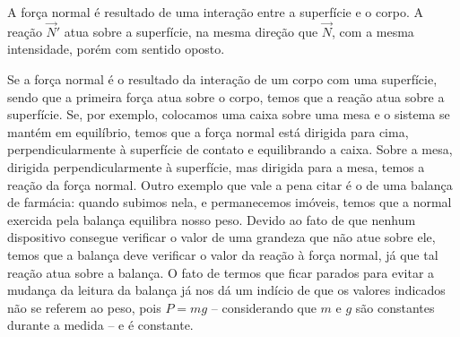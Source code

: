 \begin{marginfigure}[-4cm]
\centering
{}
\caption{A força normal é resultado de uma interação entre a superfície e o corpo. A reação $\vec{N}'$ atua sobre a superfície, na mesma direção que $\vec{N}$, com a mesma intensidade, porém com sentido oposto.}
\end{marginfigure}

Se a força normal é o resultado da interação de um corpo com uma superfície, sendo que a primeira força atua sobre o corpo, temos que a reação atua sobre a superfície. Se, por exemplo, colocamos uma caixa sobre uma mesa e o sistema se mantém em equilíbrio, temos que a força normal está dirigida para cima, perpendicularmente à superfície de contato e equilibrando a caixa. Sobre a mesa, dirigida perpendicularmente à superfície, mas dirigida para a mesa, temos a reação da força normal. Outro exemplo que vale a pena citar é o de uma balança de farmácia: quando subimos nela, e permanecemos imóveis, temos que a normal exercida pela balança equilibra nosso peso.  Devido ao fato de que nenhum dispositivo consegue verificar o valor de uma grandeza que não atue sobre ele, temos que a balança deve verificar o valor da reação à força normal, já que tal reação atua sobre a balança. O fato de termos que ficar parados para evitar a mudança da leitura da balança já nos dá um indício de que os valores indicados não se referem ao peso, pois $P = mg$ -- considerando que $m$ e $g$ são constantes durante a medida -- e é constante.

